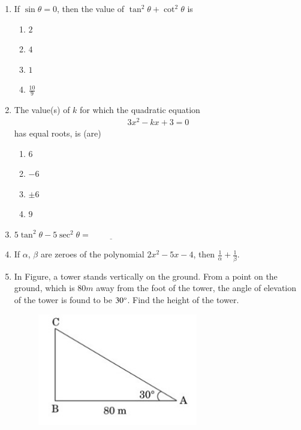 \documentclass{article}
\theoremstyle{remark}
\begin{document}
\begin{enumerate}
    \item If $\sin \theta=0$, then the value of $\tan^2\theta+\cot^2\theta$ is
    \begin{enumerate}
        \item $2$
        \item $4$
        \item $1$
        \item $\frac{10}{9}$
    \end{enumerate}
    \item The value(s) of $k$ for which the quadratic equation 
    \begin{align}
        3x^2 - kx + 3 = 0
    \end{align}
    has equal roots, is (are) 
    \begin{enumerate}
        \item $6$
        \item $-6$
        \item $\pm6$
        \item $9$
    \end{enumerate}
    \item $5\tan^2 \theta - 5\sec^2\theta = \underline{\hspace{2cm}}$
    \item If $\alpha$, $\beta$ are zeroes of the polynomial $2x^2 - 5x - 4$, then $\frac{1}{\alpha}+\frac{1}{\beta}$.
    \item In Figure, a tower stands vertically on the ground. From a point on the ground, which is $80m$ away from the foot of the tower, the angle of elevation of the tower is found to be $30\degree$. Find the height of the tower.
    \begin{figure}[H]
        \centering
        \includegraphics[width=70mm]{figs/as.jpeg}

\end{figure}
\end{enumerate}
\end{document}
